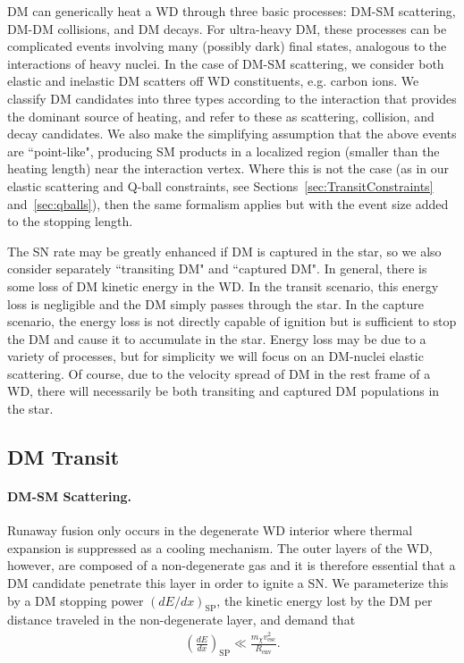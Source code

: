 \documentclass[preprintnumbers,amsmath,amssymb,prd,superscriptaddress]{revtex4}
\begin{document}
DM can generically heat a WD through three basic processes: DM-SM scattering, DM-DM collisions, and DM decays.
For ultra-heavy DM, these processes can be complicated events involving many (possibly dark) final states, analogous to the interactions of heavy nuclei.
In the case of DM-SM scattering, we consider both elastic and inelastic DM scatters off WD constituents, e.g. carbon ions.
We classify DM candidates into three types according to the interaction that provides the dominant source of heating, and refer to these as scattering, collision, and decay candidates.
We also make the simplifying assumption that the above events are ``point-like", producing SM products in a localized region (smaller than the heating length) near the interaction vertex.
Where this is not the case (as in our elastic scattering and Q-ball constraints, see Sections~\ref{sec:TransitConstraints} and~\ref{sec:qballs}), then the same formalism applies but with the event size added to the stopping length.

The SN rate may be greatly enhanced if DM is captured in the star, so we also consider separately ``transiting DM" and ``captured DM".
In general, there is some loss of DM kinetic energy in the WD.
In the transit scenario, this energy loss is negligible and the DM simply passes through the star.
In the capture scenario, the energy loss is not directly capable of ignition but is sufficient to stop the DM and cause it to accumulate in the star.
Energy loss may be due to a variety of processes, but for simplicity we will focus on an DM-nuclei elastic scattering.
Of course, due to the velocity spread of DM in the rest frame of a WD, there will necessarily be both transiting and captured DM populations in the star.

\subsection{DM Transit}

\paragraph{DM-SM Scattering.}
Runaway fusion only occurs in the degenerate WD interior where thermal expansion is suppressed as a cooling mechanism.
The outer layers of the WD, however, are composed of a non-degenerate gas and it is therefore essential that a DM candidate penetrate this layer in order to ignite a SN.
We parameterize this by a DM stopping power $(dE/dx)_\text{SP}$, the kinetic energy lost by the DM per distance traveled in the non-degenerate layer, and demand that
\begin{align}
\label{eq:CrustCondition}
  \left( \frac{d E}{d x} \right)_\text{SP} \ll
  \frac{m_\chi v^2_\text{esc}}{R_\text{env}}.
\end{align}
\end{document}
